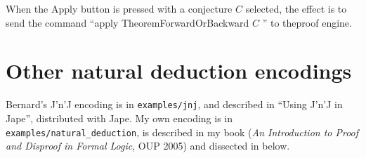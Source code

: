 When the Apply button is pressed with a conjecture $C$ selected, the effect is to send the command ``apply TheoremForwardOrBackward $C$ '' to theproof engine.

\section{Other natural deduction encodings}

Bernard's J'n'J encoding is in \texttt{examples/jnj}, and described in ``Using J'n'J in Jape'', distributed with Jape. My own encoding is in \texttt{examples/natural\_deduction}, is described in my book (\textit{An Introduction to Proof and Disproof in Formal Logic}, OUP 2005) and dissected in  below.
 